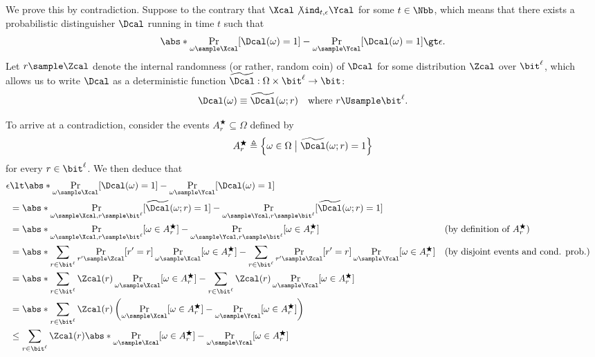 \begin{answer}[iii]
    We prove this by contradiction. Suppose to the contrary that $\Xcal\not\ind_{t,\epsilon} \Ycal$ for some $t\in\Nbb$, which means that there exists a probabilistic distinguisher $\Dcal$ running in time $t$ such that
    \[
        \abs*{\Pr_{\omega\sample \Xcal}[\Dcal(\omega)=1]-\Pr_{\omega\sample \Ycal}[\Dcal(\omega)=1]} \gt \epsilon.
    \]
    Let $r\sample \Zcal$ denote the internal randomness (or rather, random coin) of $\Dcal$ for some distribution $\Zcal$ over $\bit^{\ell}$, which allows us to write $\Dcal$ as a deterministic function $\widetilde{\Dcal}: \Omega\times \bit^{\ell} \to \bit$:
    \[
        \Dcal(\omega) \equiv \widetilde{\Dcal}(\omega; r) \quad \textrm{where } r\Usample \bit^{\ell}.
    \]
    
    To arrive at a contradiction, consider the events $A^\bigstar_r\subseteq \Omega$ defined by
    \[ 
        A^\bigstar_r\triangleq \left\{\omega \in \Omega \bigm\vert \widetilde{\Dcal}(\omega; r)=1 \right\}
    \]
    for every $r\in\bit^{\ell}$. We then deduce that
    \begin{align*}
        \epsilon &\lt \abs*{\Pr_{\omega\sample \Xcal}[\Dcal(\omega)=1]-\Pr_{\omega\sample \Ycal}[\Dcal(\omega)=1]}\\
        &= \abs*{\Pr_{\omega\sample \Xcal, r\sample \bit^{\ell}}[\widetilde{\Dcal}(\omega;r)=1]-\Pr_{\omega\sample \Ycal, r\sample \bit^{\ell}}[\widetilde{\Dcal}(\omega; r)=1]}\\
        &= \abs*{\Pr_{\omega\sample \Xcal, r\sample \bit^{\ell}}[\omega\in A^\bigstar_r]-\Pr_{\omega\sample \Ycal, r\sample \bit^{\ell}}[\omega\in A^\bigstar_r]}
        && (\textrm{by definition of } A^\bigstar_r)\\
        &= \abs*{\sum_{r\in \bit^{\ell}}\Pr_{r'\sample \Zcal}[r'=r]\Pr_{\omega\sample \Xcal}[\omega\in A^\bigstar_r]- \sum_{r\in \bit^{\ell}}\Pr_{r'\sample \Zcal}[r'=r]\Pr_{\omega\sample \Ycal}[\omega\in A^\bigstar_r]}
        && (\textrm{by disjoint events and cond. prob.})\\
        &= \abs*{\sum_{r\in \bit^{\ell}} \Zcal(r) \Pr_{\omega\sample \Xcal}[\omega\in A^\bigstar_r]- \sum_{r\in \bit^{\ell}} \Zcal(r)\Pr_{\omega\sample \Ycal}[\omega\in A^\bigstar_r]}\\
        &= \abs*{\sum_{r\in \bit^{\ell}} \Zcal(r) \left(\Pr_{\omega\sample \Xcal}[\omega\in A^\bigstar_r]- \Pr_{\omega\sample \Ycal}[\omega\in A^\bigstar_r] \right)} \\
        &\le \sum_{r\in \bit^{\ell}} \Zcal(r) \abs*{\Pr_{\omega\sample \Xcal}[\omega\in A^\bigstar_r]- \Pr_{\omega\sample \Ycal}[\omega\in A^\bigstar_r]} 

\end{align*}
\end{answer}
